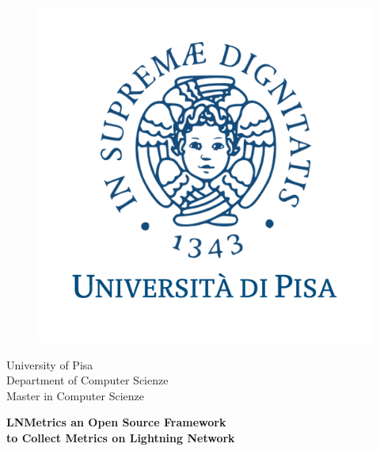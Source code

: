 \begin{titlepage}
\begin{figure}[!htb]
    \centering
    \includegraphics[keepaspectratio=true,scale=0.45]{format/img/unipi.png}
\end{figure}

\begin{center}
    \LARGE{University of Pisa}
    \vspace{5mm}
    \\ \large{Department of Computer Scienze}
    \vspace{5mm}
    \\ \LARGE{Master in Computer Scienze}
\end{center}

\vspace{8mm}
\begin{center}
    {\LARGE{\bf LNMetrics an Open Source Framework\\ \vspace{5mm} to Collect Metrics on Lightning Network }}
    
    
\end{center}
\vspace{30mm}


\end{titlepage}
